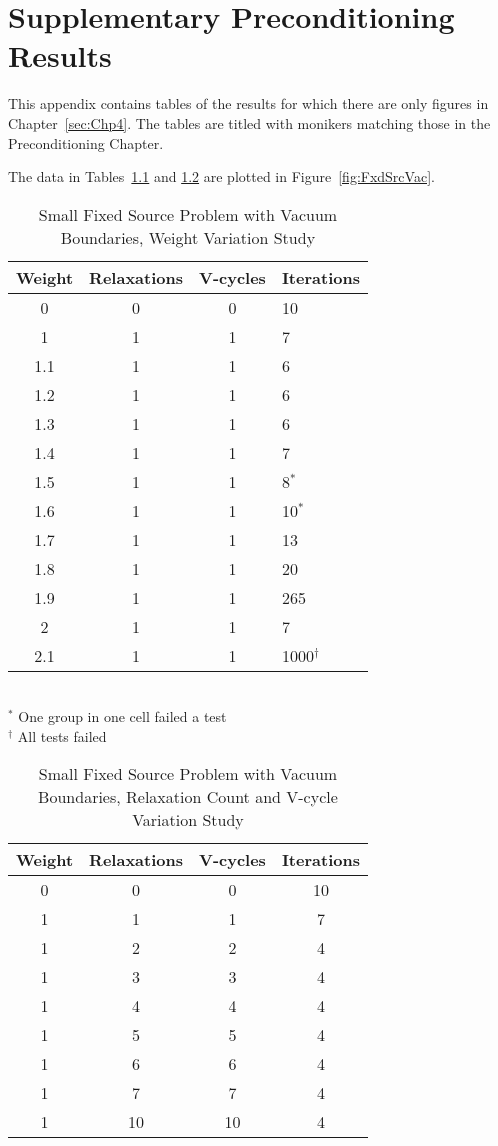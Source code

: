 
\chapter{Supplementary Preconditioning Results}
\label{sec:AppendixD}
This appendix contains tables of the results for which there are only figures in Chapter~\ref{sec:Chp4}. The tables are titled with monikers matching those in the Preconditioning Chapter. 

The data in Tables~\ref{table:FxdSrcTstVacWeight} and \ref{table:FxdSrcTstVacRV} are plotted in Figure~\ref{fig:FxdSrcVac}.
\begin{table}[!h]
\caption{Small Fixed Source Problem with Vacuum Boundaries, Weight Variation Study}
\begin{center}
\begin{tabular}{c c c l}
\hline
Weight & Relaxations & V-cycles & Iterations \\[0.5ex]
\hline
0    & 0 & 0 & 10 \\
1    & 1 & 1 & 7 \\
1.1 & 1 & 1 & 6 \\
1.2 & 1 & 1 & 6 \\
1.3 & 1 & 1 & 6 \\
1.4 & 1 & 1 & 7 \\
1.5 & 1 & 1 & 8$^{*}$ \\
1.6 & 1 & 1 & 10$^{*}$ \\
1.7 & 1 & 1 & 13 \\
1.8 & 1 & 1 & 20 \\
1.9 & 1 & 1 & 265 \\
2    & 1 & 1 & 7 \\
2.1 & 1 & 1 & 1000$^{\dagger}$ \\
\hline 
\end{tabular} \\
$^{*}$ One group in one cell failed a test \\
$^{\dagger}$ All tests failed
\end{center}
\label{table:FxdSrcTstVacWeight}
\end{table}

\begin{table}[!h]
\caption{Small Fixed Source Problem with Vacuum Boundaries, Relaxation Count and V-cycle Variation Study}
\begin{center}
\begin{tabular}{c c c c}
\hline
Weight & Relaxations & V-cycles & Iterations \\[0.5ex]
\hline
0  & 0 & 0 & 10 \\
1 & 1 & 1 & 7 \\
1 & 2 & 2 & 4 \\
1 & 3 & 3 & 4 \\
1 & 4 & 4 & 4 \\
1 & 5 & 5 & 4 \\
1 & 6 & 6 & 4 \\
1 & 7 & 7 & 4 \\
1 & 10 & 10 & 4 \\
\hline 
\end{tabular}
\end{center}
\label{table:FxdSrcTstVacRV}
\end{table}

